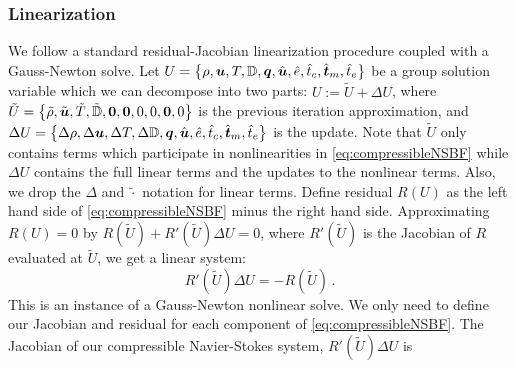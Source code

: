 \documentclass[Proposal.tex]{subfiles}
\begin{document}
\subsubsection{Linearization}
We follow a standard residual-Jacobian linearization procedure coupled with a Gauss-Newton solve.
Let $U=\left\{ \rho,\boldsymbol u,T,\mathbb{D},\boldsymbol q,\hat{\boldsymbol u},\hat e,\hat t_c,\hat{\boldsymbol t}_m,\hat t_e \right\}$ be a group solution variable which we can decompose into two parts:
$U:=\tilde U+\Delta U$, where
$\tilde U = \left\{ \tilde\rho,\tilde{\boldsymbol u},\tilde T,\tilde{\mathbb{D}},\boldsymbol{0},\boldsymbol{0},0,0,\boldsymbol{0},0 \right\}$ is the previous iteration approximation, 
and $\Delta U=\left\{ \Delta\rho,\Delta\boldsymbol u,\Delta T,\Delta\mathbb{D},\boldsymbol q,\hat{\boldsymbol u},\hat e,\hat t_c,\hat{\boldsymbol t}_m,\hat t_e \right\}$ is the update.
Note that $\tilde U$ only contains terms which participate in nonlinearities in \eqref{eq:compressibleNSBF} 
while $\Delta U$ contains the full linear terms and the updates to the nonlinear terms.
Also, we drop the $\Delta$ and $\tilde\cdot$ notation for linear terms.
Define residual $R(U)$ as the left hand side of \eqref{eq:compressibleNSBF} minus the right hand side.
Approximating $R(U)=0$ by $R(\tilde U)+R'(\tilde U)\Delta U=0$, where $R'(\tilde U)$ is the Jacobian of $R$ evaluated at $\tilde U$, we get a linear system:
\begin{equation}
	R'(\tilde U)\Delta U=-R(\tilde U)\,.
\end{equation}
This is an instance of a Gauss-Newton nonlinear solve.
We only need to define our Jacobian and residual for each component of \eqref{eq:compressibleNSBF}. 
The Jacobian of our compressible Navier-Stokes system, $R'(\tilde U)\Delta U$ is
\end{document}

